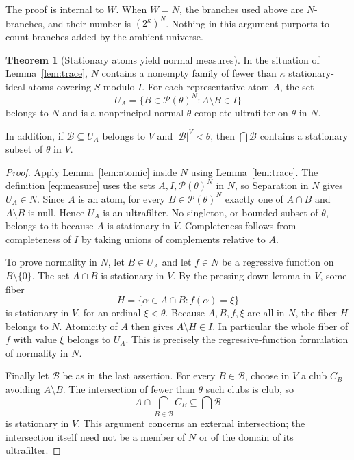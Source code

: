 \documentclass[11pt,letterpaper]{article}
\theoremstyle{definition}
\newtheorem{theorem}[definition]{Theorem}
\numberwithin{equation}{section}
\newcommand{\Pow}{\mathcal P}
\begin{document}
The proof is internal to $W$. When $W=N$, the branches used above are $N$-branches, and their number is $(2^\kappa)^N$. Nothing in this argument purports to count branches added by the ambient universe.

\begin{theorem}[Stationary atoms yield normal measures]\label{thm:measure}
In the situation of Lemma~\ref{lem:trace}, $N$ contains a nonempty family of fewer than $\kappa$ stationary-ideal atoms covering $S$ modulo $I$. For each representative atom $A$, the set
\begin{equation}\label{eq:measure}
U_A=\{B\in\Pow(\theta)^N:A\setminus B\in I\}
\end{equation}
belongs to $N$ and is a nonprincipal normal $\theta$-complete ultrafilter on $\theta$ in $N$.

In addition, if $\mathcal B\subseteq U_A$ belongs to $V$ and $|\mathcal B|^V<\theta$, then $\bigcap\mathcal B$ contains a stationary subset of $\theta$ in $V$.
\end{theorem}

\begin{proof}
Apply Lemma~\ref{lem:atomic} inside $N$ using Lemma~\ref{lem:trace}. The definition \eqref{eq:measure} uses the sets $A,I,\Pow(\theta)^N$ in $N$, so Separation in $N$ gives $U_A\in N$. Since $A$ is an atom, for every $B\in\Pow(\theta)^N$ exactly one of $A\cap B$ and $A\setminus B$ is null. Hence $U_A$ is an ultrafilter. No singleton, or bounded subset of $\theta$, belongs to it because $A$ is stationary in $V$. Completeness follows from completeness of $I$ by taking unions of complements relative to $A$.

To prove normality in $N$, let $B\in U_A$ and let $f\in N$ be a regressive function on $B\setminus\{0\}$. The set $A\cap B$ is stationary in $V$. By the pressing-down lemma in $V$, some fiber
\[
H=\{\alpha\in A\cap B:f(\alpha)=\xi\}
\]
is stationary in $V$, for an ordinal $\xi<\theta$. Because $A,B,f,\xi$ are all in $N$, the fiber $H$ belongs to $N$. Atomicity of $A$ then gives $A\setminus H\in I$. In particular the whole fiber of $f$ with value $\xi$ belongs to $U_A$. This is precisely the regressive-function formulation of normality in $N$.

Finally let $\mathcal B$ be as in the last assertion. For every $B\in\mathcal B$, choose in $V$ a club $C_B$ avoiding $A\setminus B$. The intersection of fewer than $\theta$ such clubs is club, so
\[
A\cap\bigcap_{B\in\mathcal B}C_B\subseteq\bigcap\mathcal B
\]
is stationary in $V$. This argument concerns an external intersection; the intersection itself need not be a member of $N$ or of the domain of its ultrafilter.
\end{proof}
\end{document}
